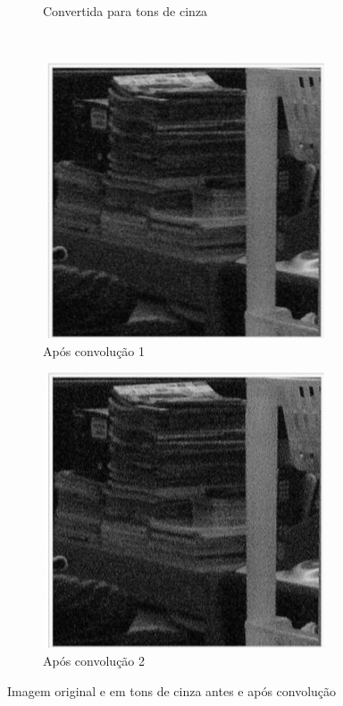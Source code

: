 \documentclass[10pt,a4paper]{article}
\begin{document}
\begin{figure}[!ht]
\begin{subfigure}[ht]{0.45\textwidth}
        \caption{Convertida para tons de cinza}
        \label{fig:src}
    \end{subfigure}
    \\
    \begin{subfigure}[ht]{0.45\textwidth}
        \includegraphics[width=\textwidth]{dst1.jpg}
        \caption{Após convolução 1}
        \label{fig:dst1}
    \end{subfigure}
    \qquad
    \begin{subfigure}[ht]{0.45\textwidth}
        \includegraphics[width=\textwidth]{dst2.jpg}
        \caption{Após convolução 2}
        \label{fig:dst2}
    \end{subfigure}
    \caption{Imagem original e em tons de cinza antes e após convolução}
\end{figure}
\end{document}
